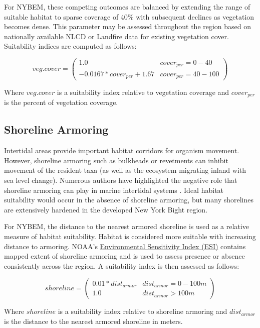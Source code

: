 \documentclass[
]{book}
\begin{document}
For NYBEM, these competing outcomes are balanced by extending the range of suitable habitat to sparse coverage of 40\% with subsequent declines as vegetation becomes dense. This parameter may be assessed throughout the region based on nationally available NLCD or Landfire data for existing vegetation cover. Suitability indices are computed as follows:

\[veg.cover = \begin{pmatrix} 1.0 & cover_{per}=0-40\\
-0.0167*cover_{per}+1.67 & cover_{per}=40-100
\end{pmatrix}\]

Where \(veg.cover\) is a suitability index relative to vegetation coverage and \(cover_{per}\) is the percent of vegetation coverage.

\hypertarget{shoreline-armoring-1}{%
\subsection{Shoreline Armoring}\label{shoreline-armoring-1}}

Intertidal areas provide important habitat corridors for organism movement. However, shoreline armoring such as bulkheads or revetments can inhibit movement of the resident taxa (as well as the ecosystem migrating inland with sea level change). Numerous authors have highlighted the negative role that shoreline armoring can play in marine intertidal systems \citep[\citet{lathrope_mapping_2013}]{usace_evaluation_2009}. Ideal habitat suitability would occur in the absence of shoreline armoring, but many shorelines are extensively hardened in the developed New York Bight region.

For NYBEM, the distance to the nearest armored shoreline is used as a relative measure of habitat suitability. Habitat is considered more suitable with increasing distance to armoring. NOAA's \href{https://response.restoration.noaa.gov/resources/environmental-sensitivity-index-esi-maps}{Environmental Sensitivity Index (ESI)} contains mapped extent of shoreline armoring and is used to assess presence or absence consistently across the region. A suitability index is then assessed as follows:

\[shoreline = \begin{pmatrix} 0.01*dist_{armor} & dist_{armor}=0-100m\\
1.0 & dist_{armor}>100m
\end{pmatrix}\]

Where \(shoreline\) is a suitability index relative to shoreline armoring and \(dist_{armor}\) is the distance to the nearest armored shoreline in meters.
\end{document}
